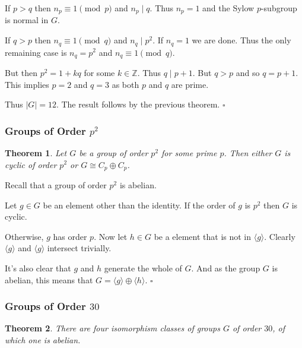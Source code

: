 \documentclass[10pt]{article}
\newtheorem{theorem}{Theorem}[section]
\newenvironment{proof}[1][Proof]{\begin{trivlist}
\item[\hskip \labelsep {\itshape #1}]}{\end{trivlist}}
\begin{document}
\begin{proof}
If $p > q$ then $n_p \equiv 1 \pmod{p}$ and $n_p \;|\; q$. Thus $n_p = 1$ and the Sylow $p$-subgroup is normal in $G$.

If $q > p$ then $n_q \equiv 1 \pmod{q}$ and $n_q \;|\; p^2$. If $n_q = 1$ we are done. Thus the only remaining case is $n_q = p^2$ and $n_q \equiv 1 \pmod{q}$.

But then $p^2 = 1 + kq$ for some $k \in \mathbb{Z}$. Thus $q \;|\; p + 1$. But $q > p$ and so $q = p + 1$. This implies $p = 2$ and $q = 3$ as both $p$ and $q$ are prime.

Thus $|G| = 12$. The result follows by the previous theorem. $\square$
\end{proof}

\subsubsection{Groups of Order $p^2$}

\begin{theorem}
Let $G$ be a group of order $p^2$ for some prime $p$. Then either $G$ is cyclic of order $p^2$ or $G \cong C_p\oplus C_p$.
\end{theorem}

\begin{proof}
Recall that a group of order $p^2$ is abelian.

Let $g \in G$ be an element other than the identity. If the order of $g$ is $p^2$ then $G$ is cyclic.

Otherwise, $g$ has order $p$. Now let $h \in G$ be a element that is not in $\langle g \rangle$. Clearly $\langle g \rangle$ and $\langle g \rangle$ intersect trivially.

It's also clear that $g$ and $h$ generate the whole of $G$. And as the group $G$ is abelian, this means that $G = \langle g \rangle \oplus \langle h \rangle$. $\square$
\end{proof}

\subsubsection{Groups of Order $30$}

\begin{theorem}
There are four isomorphism classes of groups $G$ of order $30$, of which one is abelian.
\end{theorem}
\end{document}
